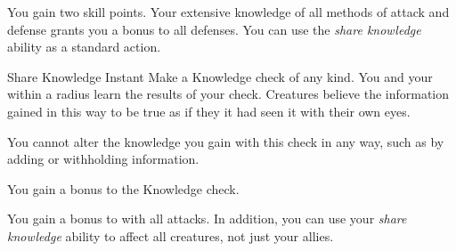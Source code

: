              You gain two skill points.
             Your extensive knowledge of all methods of attack and defense grants you a  bonus to all defenses.
             You can use the \textit{share knowledge} ability as a standard action.
            \begin{instantability}{Share Knowledge}
                Instant
                \rankline
                Make a Knowledge check of any kind.
                You and your  within a \arealarge radius learn the results of your check.
                Creatures believe the information gained in this way to be true as if they it had seen it with their own eyes.

                You cannot alter the knowledge you gain with this check in any way, such as by adding or withholding information.

                \rankline
                 You gain a  bonus to the Knowledge check.
            \end{instantability}
             You gain a  bonus to  with all attacks.
            In addition, you can use your \textit{share knowledge} ability to affect all creatures, not just your allies.

